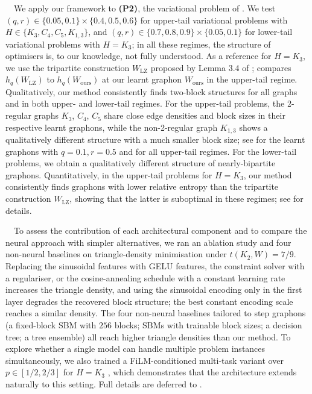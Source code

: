 \documentclass[11pt]{article}
\theoremstyle{plain}
\theoremstyle{definition}
\theoremstyle{remark}
\begin{document}
\ $\,$
We apply our framework to \textbf{(P2)}, the variational problem of \citet{chatterjee2011large}.
We test $(q, r) \in \{0.05, 0.1\} \times \{0.4, 0.5, 0.6\}$ for upper-tail variational problems with $H \in \{K_3, C_4, C_5, K_{1,3}\}$, and $(q, r) \in \{0.7, 0.8, 0.9\} \times \{0.05, 0.1\}$ for lower-tail variational problems with $H = K_3$; in all these regimes, the structure of optimisers is, to our knowledge, not fully understood. As a reference for $H = K_3$, we use the tripartite construction $W_{\mathrm{LZ}}$ proposed by Lemma 3.4 of \citet{lubetzky2015replica};  compares $h_q(W_{\mathrm{LZ}})$ to $h_q(W_{\mathrm{ours}})$ at our learnt graphon $W_{\mathrm{ours}}$ in the upper-tail regime.
Qualitatively, our method consistently finds two-block structures for all graphs and in both upper- and lower-tail regimes.
For the upper-tail problems, the 2-regular graphs $K_3$, $C_4$, $C_5$ share close edge densities and block sizes in their respective learnt graphons, while the non-2-regular graph $K_{1,3}$ shows a qualitatively different structure with a much smaller block size; see  for the learnt graphons with $q=0.1, r=0.5$ and  for all upper-tail regimes.
For the lower-tail problems, we obtain a qualitatively different structure of nearly-bipartite graphons.
Quantitatively, in the upper-tail problems for $H = K_3$, our method consistently finds graphons with lower relative entropy than the tripartite construction $W_{\mathrm{LZ}}$, showing that the latter is suboptimal in these regimes; see  for details.

\  $\,$
To assess the contribution of each architectural component and to compare the neural approach with simpler alternatives, we ran an ablation study and four non-neural baselines on triangle-density minimisation under $t(K_2, W) = 7/9$. Replacing the sinusoidal features with GELU features, the constraint solver with a regulariser, or the cosine-annealing schedule with a constant learning rate increases the triangle density, and using the sinusoidal encoding only in the first layer degrades the recovered block structure; the best constant encoding scale reaches a similar density. The four non-neural baselines tailored to step graphons (a fixed-block SBM with $256$ blocks; SBMs with trainable block sizes; a decision tree; a tree ensemble) all reach higher triangle densities than our method. To explore whether a single model can handle multiple problem instances simultaneously, we also trained a FiLM-conditioned multi-task variant over $p \in [1/2, 2/3]$ for $H = K_3$ \citep{perez2018film}, which demonstrates that the architecture extends naturally to this setting. Full details are deferred to .
\end{document}
